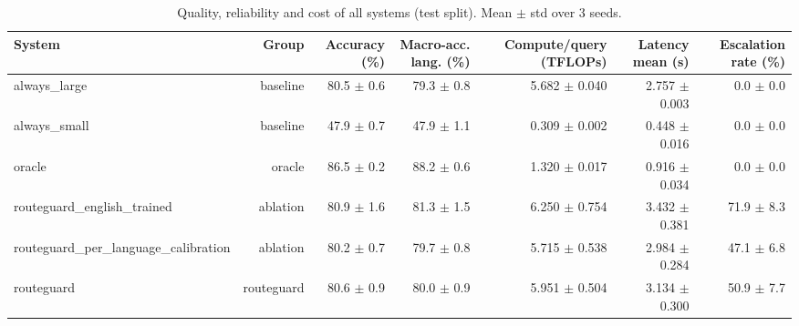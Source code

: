 \begin{table}[t]
\centering
\small
\caption{Quality, reliability and cost of all systems (test split). Mean $\pm$ std over 3 seeds.}
\label{tab:main_results}
\begin{tabular}{lrrrrrr}
\toprule
System & Group & Accuracy (\%) & Macro-acc. lang. (\%) & Compute/query (TFLOPs) & Latency mean (s) & Escalation rate (\%) \\
\midrule
always\_large & baseline & 80.5 $\pm$ 0.6 & 79.3 $\pm$ 0.8 & 5.682 $\pm$ 0.040 & 2.757 $\pm$ 0.003 & 0.0 $\pm$ 0.0 \\
always\_small & baseline & 47.9 $\pm$ 0.7 & 47.9 $\pm$ 1.1 & 0.309 $\pm$ 0.002 & 0.448 $\pm$ 0.016 & 0.0 $\pm$ 0.0 \\
oracle & oracle & 86.5 $\pm$ 0.2 & 88.2 $\pm$ 0.6 & 1.320 $\pm$ 0.017 & 0.916 $\pm$ 0.034 & 0.0 $\pm$ 0.0 \\
routeguard\_english\_trained & ablation & 80.9 $\pm$ 1.6 & 81.3 $\pm$ 1.5 & 6.250 $\pm$ 0.754 & 3.432 $\pm$ 0.381 & 71.9 $\pm$ 8.3 \\
routeguard\_per\_language\_calibration & ablation & 80.2 $\pm$ 0.7 & 79.7 $\pm$ 0.8 & 5.715 $\pm$ 0.538 & 2.984 $\pm$ 0.284 & 47.1 $\pm$ 6.8 \\
routeguard & routeguard & 80.6 $\pm$ 0.9 & 80.0 $\pm$ 0.9 & 5.951 $\pm$ 0.504 & 3.134 $\pm$ 0.300 & 50.9 $\pm$ 7.7 \\
\bottomrule
\end{tabular}
\end{table}
